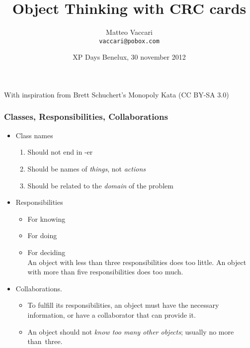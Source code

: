 \documentclass[handout,t,12pt]{beamer}
\title{Object Thinking with CRC cards}
\author[@xpmatteo]{Matteo Vaccari \\ \texttt{vaccari@pobox.com}}
\institute{Milano XP User Group}
\date[XP Days 2012]{XP Days Benelux, 30 november 2012}
\begin{document}
  \begin{frame}
    \titlepage
    \begin{center}
      \small
    	With inspiration from Brett Schuchert's Monopoly Kata
    	\vfill
    	\tiny
    	(CC BY-SA 3.0)
    \end{center}    
  \end{frame}

  \begin{frame}\frametitle{Classes, Responsibilities, Collaborations}

    \begin{itemize}
      \item Class names
      \begin{enumerate}
        \item Should not end in -er
        \item Should be names of \emph{things}, not \emph{actions}
        \item Should be related to the \emph{domain} of the problem 
      \end{enumerate}
      \item Responsibilities
      \begin{itemize}
        \item For knowing
        \item For doing
        \item For deciding\\
        An object with less than three responsibilities does too little.  An object with more than five responsibilities does too much.  
      \end{itemize}
      \item Collaborations. 
      \begin{itemize}
        \item To fulfill its responsibilities, an object must have the necessary information, or have a collaborator that can provide it.
        \item An object should not \emph{know too many other objects}; usually no more than~three.
      \end{itemize}
    \end{itemize}
  \end{frame}
\end{document}
